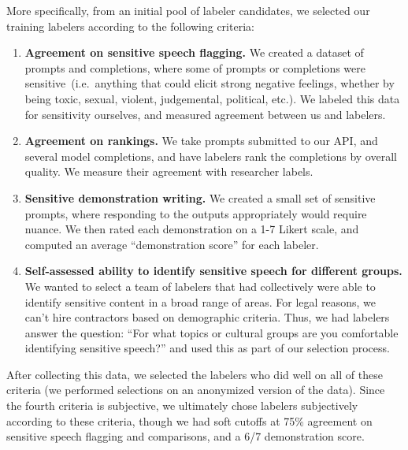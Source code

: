 \documentclass{article}
\begin{document}
More specifically, from an initial pool of labeler candidates, we selected our training labelers according to the following criteria:
\begin{enumerate}
    \item \textbf{Agreement on sensitive speech flagging.} We created a dataset of prompts and completions, where some of prompts or completions were sensitive~(i.e.\ anything that could elicit strong negative feelings, whether by being toxic, sexual, violent, judgemental, political, etc.). We labeled this data for sensitivity ourselves, and measured agreement between us and labelers.
    \item \textbf{Agreement on rankings.} We take prompts submitted to our API, and several model completions, and have labelers rank the completions by overall quality. We measure their agreement with researcher labels.
    \item \textbf{Sensitive demonstration writing.} We created a small set of sensitive prompts, where responding to the outputs appropriately would require nuance. We then rated each demonstration on a 1-7 Likert scale, and computed an average ``demonstration score'' for each labeler.
    \item \textbf{Self-assessed ability to identify sensitive speech for different groups.} We wanted to select a team of labelers that had collectively were able to identify sensitive content in a broad range of areas. For legal reasons, we can't hire contractors based on demographic criteria. Thus, we had labelers answer the question: ``For what topics or cultural groups are you comfortable identifying sensitive speech?'' and used this as part of our selection process.
\end{enumerate}

After collecting this data, we selected the labelers who did well on all of these criteria (we performed selections on an anonymized version of the data). Since the fourth criteria is subjective, we ultimately chose labelers subjectively according to these criteria, though we had soft cutoffs at 75\% agreement on sensitive speech flagging and comparisons, and a 6/7 demonstration score. 
\end{document}
